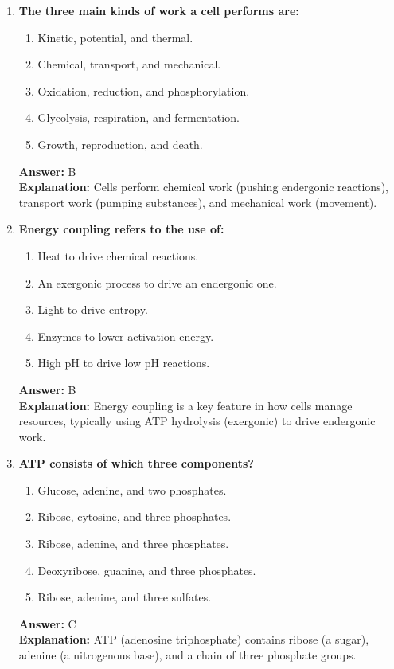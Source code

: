 \documentclass[11pt, a4paper]{article}
\begin{document}
\begin{enumerate}[leftmargin=*, label=\arabic*.]
\item \textbf{The three main kinds of work a cell performs are:}
\begin{enumerate}[label=\Alph*.]
    \item Kinetic, potential, and thermal.
    \item Chemical, transport, and mechanical.
    \item Oxidation, reduction, and phosphorylation.
    \item Glycolysis, respiration, and fermentation.
    \item Growth, reproduction, and death.
\end{enumerate}
\textbf{Answer:} B \\
\textbf{Explanation:} Cells perform chemical work (pushing endergonic reactions), transport work (pumping substances), and mechanical work (movement).

\item \textbf{Energy coupling refers to the use of:}
\begin{enumerate}[label=\Alph*.]
    \item Heat to drive chemical reactions.
    \item An exergonic process to drive an endergonic one.
    \item Light to drive entropy.
    \item Enzymes to lower activation energy.
    \item High pH to drive low pH reactions.
\end{enumerate}
\textbf{Answer:} B \\
\textbf{Explanation:} Energy coupling is a key feature in how cells manage resources, typically using ATP hydrolysis (exergonic) to drive endergonic work.

\item \textbf{ATP consists of which three components?}
\begin{enumerate}[label=\Alph*.]
    \item Glucose, adenine, and two phosphates.
    \item Ribose, cytosine, and three phosphates.
    \item Ribose, adenine, and three phosphates.
    \item Deoxyribose, guanine, and three phosphates.
    \item Ribose, adenine, and three sulfates.
\end{enumerate}
\textbf{Answer:} C \\
\textbf{Explanation:} ATP (adenosine triphosphate) contains ribose (a sugar), adenine (a nitrogenous base), and a chain of three phosphate groups.


\end{enumerate}
\end{document}
